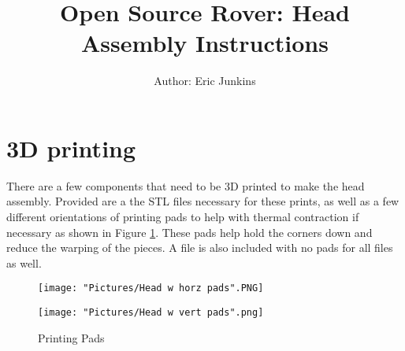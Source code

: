 \documentclass[12pt]{article}
\begin{document}
\title{Open Source Rover: Head Assembly Instructions}
\author{Author: Eric Junkins}

\makeatletter         
\def\@maketitle{
\begin{center}	
	\makebox[\textwidth][c]{ \texttt{[image: "Pictures/Head final".png]}}
	{\Huge \bfseries \sffamily \@title }\\[3ex] 
	{\Large \sffamily \@author}\\[3ex] 
	\texttt{[image: "Pictures/JPL logo".png]}
\end{center}}
\makeatother

\maketitle




\newpage


\tableofcontents

\newpage

\section{3D printing}
There are a few components that need to be 3D printed to make the head assembly. Provided are a the STL files necessary for these prints, as well as a few different orientations of printing pads to help with thermal contraction if necessary as shown in Figure \ref{pads}. These pads help hold the corners down and reduce the warping of the pieces. A file is also included with no pads for all files as well. 

\begin{figure}[H]
  \centering
  \begin{minipage}[b]{0.45\textwidth}
    \texttt{[image: "Pictures/Head w horz pads".PNG]}
  \end{minipage}
  \hfill
  \begin{minipage}[b]{0.45\textwidth}
    \texttt{[image: "Pictures/Head w vert pads".png]}
  \end{minipage}
  \caption{Printing Pads}
  \label{pads}
\end{figure}
\end{document}
